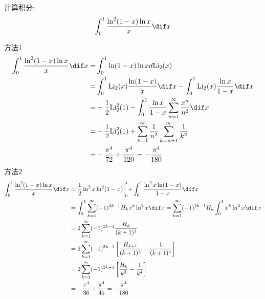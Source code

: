 \documentclass[color=green,titlestyle=hang]{elegantbook}%
\begin{document}
\begin{exercise}计算积分:\[\int_{0}^{1}\frac{\ln^2(1-x)\ln x}{x}\dif x\]
\end{exercise}\begin{Solution}方法1
\begin{align*}
\int_{0}^{1}\frac{\ln^2(1-x)\ln x}{x}\dif x=&\int_{0}^{1}\ln(1-x)\ln xd\textrm{Li}_2(x)\\
=&\int_{0}^{1}\textrm{Li}_2(x)\frac{\ln(1-x)}{x}\dif x-\int_{0}^{1}\textrm{Li}_2(x)\frac{\ln x}{1-x}\dif x\\
=&-\frac{1}{2}\textrm{Li}_{2}^{2}(1)-\int_{0}^{1}\frac{\ln x}{1-x}\sum_{n=1}^{\infty}\frac{x^n}{n^2}\dif x\\
=&-\frac{1}{2}\textrm{Li}_{2}^{2}(1)+\sum_{n=1}^{\infty}\frac{1}{n^2}\sum_{k=n+1}^{\infty}\frac{1}{k^2}\\
=&-\frac{{\pi}^4}{72}+\frac{{\pi}^4}{120}=-\frac{{\pi}^4}{180}
\end{align*}
方法2
\begin{align*}
\int_{0}^{1}\frac{\ln^2(1-x)\ln x}{x}\dif x&=\frac{1}{2}\ln^2x\ln^2(1-x)\biggl|_{0}^{1}+\int_{0}^{1}\frac{\ln^2x\ln(1-x)}{1-x}\dif x\\
&=\int_{0}^{1}\sum_{k=1}^{\infty}(-1)^{2k-1}H_kx^k\ln^2x\dif x=\sum_{k=1}^{\infty}(-1)^{2k-1}H_k\int_{0}^{1}x^k\ln^2x\dif x\\
&=2\sum_{k=1}^{\infty}(-1)^{2k-1}\frac{H_k}{(k+1)^3}\\
&=2\sum_{k=1}^{\infty}(-1)^{2k-1}\left[\frac{H_{k+1}}{(k+1)^3}-\frac{1}{(k+1)^4}\right]\\
&=2\sum_{k=1}^{\infty}(-1)^{2k-1}\left[\frac{H_{k}}{k^3}-\frac{1}{k^4}\right]\\
&=-\frac{{\pi}^4}{36}+\frac{{\pi}^4}{45}=-\frac{{\pi}^4}{180}
\end{align*}	
\end{Solution}
\end{document}

